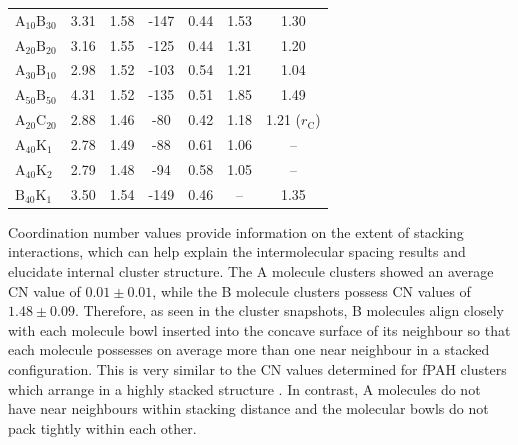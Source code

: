 \begin{table}[ht]
\begin{tabular}{lcccccc}
$\text{A}_{\text{10}}\text{B}_{\text{30}}$ & 3.31 & 1.58 & -147 & 0.44 & 1.53 & 1.30 \\ 
$\text{A}_{\text{20}}\text{B}_{\text{20}}$ & 3.16 & 1.55 & -125 & 0.44 & 1.31 & 1.20 \\
$\text{A}_{\text{30}}\text{B}_{\text{10}}$ & 2.98 & 1.52 & -103 & 0.54 &  1.21 & 1.04 \\
$\text{A}_{\text{50}}\text{B}_{\text{50}}$ & 4.31 & 1.52 & -135 & 0.51 &  1.85 & 1.49 \\ \hline
$\text{A}_{\text{20}}\text{C}_{\text{20}}$ & 2.88 & 1.46 & -80 & 0.42 &  1.18 & 1.21 ($r_{\text{C}}$) \\ \hline
$\text{A}_{\text{40}}\text{K}_{\text{1}}$ & 2.78 & 1.49 & -88 & 0.61 &  1.06 & -- \\
$\text{A}_{\text{40}}\text{K}_{\text{2}}$ & 2.79 & 1.48 & -94 & 0.58 &  1.05 & -- \\ 
$\text{B}_{\text{40}}\text{K}_{\text{1}}$ & 3.50 & 1.54 & -149 & 0.46 &  -- & 1.35 \\ 
\end{tabular}
\end{table}
%

Coordination number values provide information on the extent of stacking interactions, which can help explain the intermolecular spacing results and elucidate internal cluster structure. The A molecule clusters showed an average CN value of $0.01 \pm 0.01$, while the B molecule clusters possess CN values of $1.48 \pm 0.09$. Therefore, as seen in the cluster snapshots, B molecules align closely with each molecule bowl inserted into the concave surface of its neighbour so that each molecule possesses on average more than one near neighbour in a stacked configuration. This is very similar to the CN values determined for fPAH clusters which arrange in a highly stacked structure \cite{bowal2018partitioning}. In contrast, A molecules do not have near neighbours within stacking distance and the molecular bowls do not pack tightly within each other. 
%

